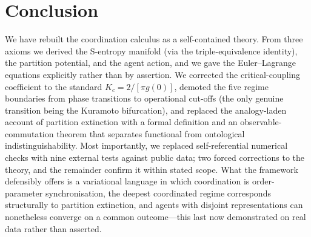 \documentclass[11pt,twocolumn,a4paper]{article}
\newcommand{\Kc}{K_c}
\begin{document}
\section{Conclusion}
\label{sec:conclusion}

We have rebuilt the coordination calculus as a self-contained theory. From three
axioms we derived the S-entropy manifold (via the triple-equivalence identity),
the partition potential, and the agent action, and we gave the Euler--Lagrange
equations explicitly rather than by assertion. We corrected the critical-coupling
coefficient to the standard $\Kc=2/[\pi g(0)]$, demoted the five regime
boundaries from phase transitions to operational cut-offs (the only genuine
transition being the Kuramoto bifurcation), and replaced the analogy-laden
account of partition extinction with a formal definition and an
observable-commutation theorem that separates functional from ontological
indistinguishability. Most importantly, we replaced self-referential numerical
checks with nine external tests against public data; two forced corrections to
the theory, and the remainder confirm it within stated scope. What the framework
defensibly offers is a variational language in which coordination is
order-parameter synchronisation, the deepest coordinated regime corresponds
structurally to partition extinction, and agents with disjoint representations
can nonetheless converge on a common outcome---this last now demonstrated on
real data rather than asserted.



\end{document}
